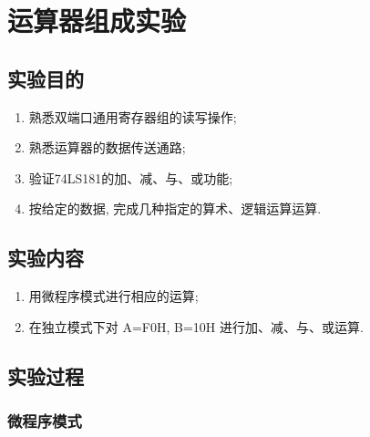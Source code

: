 \documentclass[../main.tex]{subfiles}
\begin{document}
\setcounter{chapter}{0}
\chapter{运算器组成实验}

\section{实验目的}

\begin{enumerate}

    \item 熟悉双端口通用寄存器组的读写操作;

    \item 熟悉运算器的数据传送通路;

    \item 验证74LS181的加、减、与、或功能;

    \item 按给定的数据, 完成几种指定的算术、逻辑运算运算.

\end{enumerate}

\section{实验内容}

\begin{enumerate}

    \item 用微程序模式进行相应的运算;

    \item 在独立模式下对 A=F0H, B=10H 进行加、减、与、或运算.

\end{enumerate}

\section{实验过程}

\subsection{微程序模式}
\end{document}
